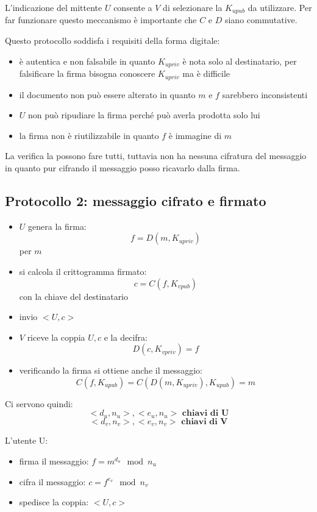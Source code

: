 L'indicazione del mittente $U$ consente a $V$ di selezionare la $K_{upub}$ da utilizzare.
Per far funzionare questo meccanismo è importante che $C$ e $D$ siano commutative.

Questo protocollo soddisfa i requisiti della forma digitale:
\begin{itemize}
    \item è autentica e non falsabile in quanto $K_{upriv}$  è nota solo al destinatario, per falsificare la firma bisogna conoscere $K_{upriv}$ ma è difficile
    \item il documento non può essere alterato in quanto $m$ e $f$ sarebbero inconsistenti
    \item $U$ non può ripudiare la firma perché può averla prodotta solo lui
    \item la firma non è riutilizzabile in quanto $f$ è immagine di $m$
\end{itemize}

La verifica la possono fare tutti, tuttavia non ha nessuna cifratura del messaggio in quanto pur cifrando il messaggio posso ricavarlo dalla firma.

\subsection{Protocollo 2: messaggio cifrato e firmato}
\begin{itemize}
    \item $U$ genera la firma:
    $$ f = D(m, K_{upriv}) $$
    per $m$
    \item si calcola il crittogramma firmato:
    $$ c = C(f, K_{vpub}) $$
    con la chiave del destinatario
    \item invio $<U, c>$
    \item $V$ riceve la coppia $U, c$ e la decifra:
    $$ D(c, K_{vpriv}) = f $$
    \item verificando la firma si ottiene anche il messaggio:
    $$ C(f, K_{upub}) = C(D(m, K_{upriv}), K_{upub}) = m $$
\end{itemize}

Ci servono quindi:
$$ <d_u, n_u>, <e_u, n_u> \textbf{ chiavi di U} $$
$$ <d_v, n_v>, <e_v, n_v> \textbf{ chiavi di V} $$

L'utente U:
\begin{itemize}
    \item firma il messaggio: $f = m^{d_u} \mod n_u$
    \item cifra il messaggio: $c = f^{e_v} \mod n_v$
    \item spedisce la coppia: $<U, c>$
\end{itemize}

